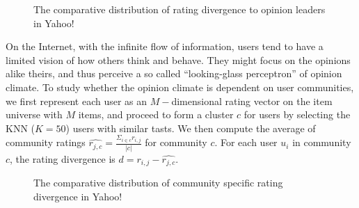 \documentclass{sig-alternate}
\begin{document}
\begin{figure}[htbp]
\centering
\centering
{}
\caption{The comparative distribution of rating divergence to opinion leaders in Yahoo!}\label{fig:leader}
\end{figure}

On the Internet, with the infinite flow of information, users tend to have a limited vision of how others think and behave. They might focus on the opinions alike theirs, and thus perceive a so called ``looking-glass perceptron'' of opinion climate. To study whether the opinion climate is dependent on user communities, we first represent each user as an $M-$dimensional rating vector on the item universe with $M$ items, and proceed to form a cluster $c$ for users by selecting the KNN ($K=50$) users with similar tasts.  We then compute the average of community ratings $\hat{r_{j,c}}=\frac{\Sigma_{i\in c}r_{i,j}}{|c|}$ for community $c$. For each user $u_i$ in community $c$, the rating divergence is   $d=r_{i,j}-\hat{r_{j,c}}$.

\begin{figure}[htbp]
\centering
\centering
{}
\caption{The comparative  distribution of community specific rating divergence in Yahoo!}\label{fig:community}
\end{figure}
\end{document}
